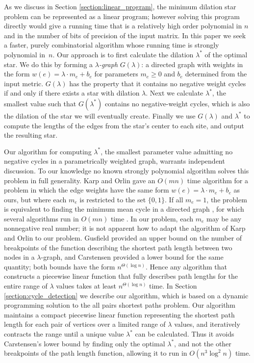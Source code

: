 \documentclass{llncs}
\begin{document}
As we discuss in Section \ref{section:linear_program}, the minimum dilation star problem can be represented as a linear program; however solving this program directly would give a running time that is a relatively high order polynomial in $n$ and in the number of bits of precision of the input matrix.  In this paper we seek a faster, purely combinatorial algorithm whose running time is strongly polynomial in~$n$.  Our approach is to first calculate the dilation $\lambda^*$ of the optimal star.  We do this by forming a \emph{$\lambda$-graph} $G(\lambda)$: a directed graph with weights in the form $w(e)=\lambda \cdot m_e + b_e$ for parameters $m_e \geq 0$ and $b_e$ determined from the input metric.  $G(\lambda)$ has the property that it contains no negative weight cycles if and only if there exists a star with dilation $\lambda$.  Next we calculate $\lambda^*$, the smallest value such that $G(\lambda^*)$ contains no negative-weight cycles, which is also the dilation of the star we will eventually create.  Finally we use $G(\lambda)$ and $\lambda^*$ to compute the lengths of the edges from the star's center to each site, and output the resulting star.

Our algorithm for computing $\lambda^*$, the smallest parameter value admitting no negative cycles in a parametrically weighted graph, warrants independent discussion.  To our knowledge no known strongly polynomial algorithm solves this problem in full generality.  Karp and Orlin \cite{ko80} gave an $O(mn)$ time algorithm for a problem in which the edge weights have the same form $w(e) = \lambda \cdot m_e + b_e$ as ours, but where each $m_e$ is restricted to the set $\{0, 1\}$.  If all $m_e=1$, the problem is equivalent to finding the minimum mean cycle in a directed graph \cite{karp78}, for which several algorithms run in $O(mn)$ time \cite{dasdan98experimental}.  In our problem, each $m_e$ may be any nonnegative real number;  it is not apparent how to adapt the algorithm of Karp and Orlin to our problem. Gusfield provided an upper bound \cite{gusfield80} on the number of breakpoints of the function describing the shortest path length between two nodes in a $\lambda$-graph, and Carstensen provided a lower bound \cite{carstensen84} for the same quantity; both bounds have the form $n^{\Theta(\log n)}$.  Hence any algorithm that constructs a piecewise linear function that fully describes path lengths for the entire range of $\lambda$ values takes at least $n^{\Theta(\log n)}$ time.   In Section \ref{section:cycle_detection} we describe our algorithm, which is based on a dynamic programming solution to the all pairs shortest paths problem.  Our algorithm maintains a compact piecewise linear function representing the shortest path length for each pair of vertices over a limited range of $\lambda$ values, and iteratively contracts the range until a unique value $\lambda^*$ can be calculated.  Thus it avoids Carstensen's lower bound by finding only the optimal $\lambda^*$, and not the other breakpoints of the path length function, allowing it to run in $O(n^3 \log^2 n)$ time.
\end{document}
